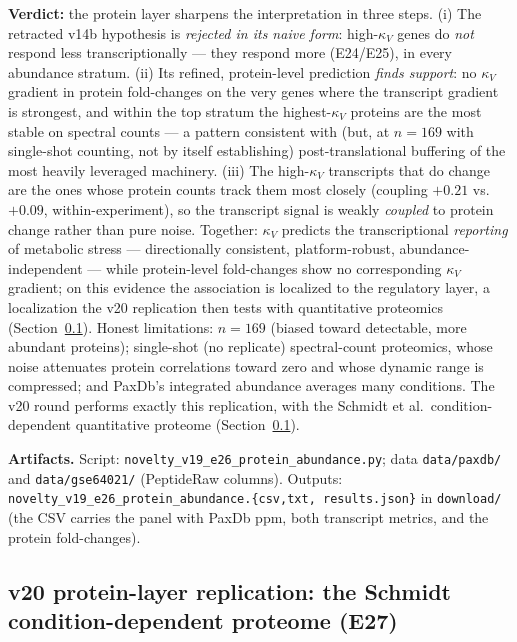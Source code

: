 \documentclass[11pt,a4paper]{article}
\theoremstyle{plain}
\theoremstyle{definition}
\theoremstyle{remark}
\begin{document}
\textbf{Verdict:} the protein layer sharpens the interpretation in
three steps. (i) The retracted v14b hypothesis is \emph{rejected in
its naive form}: high-$\kappa_V$ genes do \emph{not} respond less
transcriptionally --- they respond more (E24/E25), in every
abundance stratum. (ii) Its refined, protein-level prediction
\emph{finds support}: no $\kappa_V$ gradient in protein fold-changes
on the very genes where the transcript gradient is strongest, and
within the top stratum the highest-$\kappa_V$ proteins are the most
stable on spectral counts --- a pattern consistent with (but, at
$n = 169$ with single-shot counting, not by itself establishing)
post-translational buffering of the most heavily leveraged
machinery. (iii) The high-$\kappa_V$ transcripts that do
change are the ones whose protein counts track them most closely
(coupling $+0.21$ vs.\ $+0.09$, within-experiment), so the transcript
signal is weakly \emph{coupled} to protein change rather than pure
noise. Together: $\kappa_V$ predicts the transcriptional
\emph{reporting} of metabolic stress --- directionally consistent,
platform-robust, abundance-independent --- while protein-level
fold-changes show no corresponding $\kappa_V$ gradient; on this
evidence the association is localized to the regulatory layer, a
localization the v20 replication then tests with quantitative
proteomics (Section~\ref{sec:novelty-v20}). Honest limitations: $n = 169$
(biased toward detectable, more abundant proteins); single-shot
(no replicate) spectral-count proteomics, whose noise attenuates
protein correlations toward zero and whose dynamic range is
compressed; and PaxDb's integrated abundance averages many
conditions. The v20 round performs exactly this replication,
with the Schmidt et al.\ condition-dependent quantitative proteome
(Section~\ref{sec:novelty-v20}).

\textbf{Artifacts.} Script:
\texttt{novelty\_v19\_e26\_protein\_abundance.py}; data
\texttt{data/paxdb/} and \texttt{data/gse64021/} (PeptideRaw
columns). Outputs:
\texttt{novelty\_v19\_e26\_protein\_abundance.\{csv,txt,
results.json\}} in \texttt{download/} (the CSV carries the panel
with PaxDb ppm, both transcript metrics, and the protein
fold-changes).

\subsection{v20 protein-layer replication: the Schmidt
condition-dependent proteome (E27)}\label{sec:novelty-v20}
\end{document}
